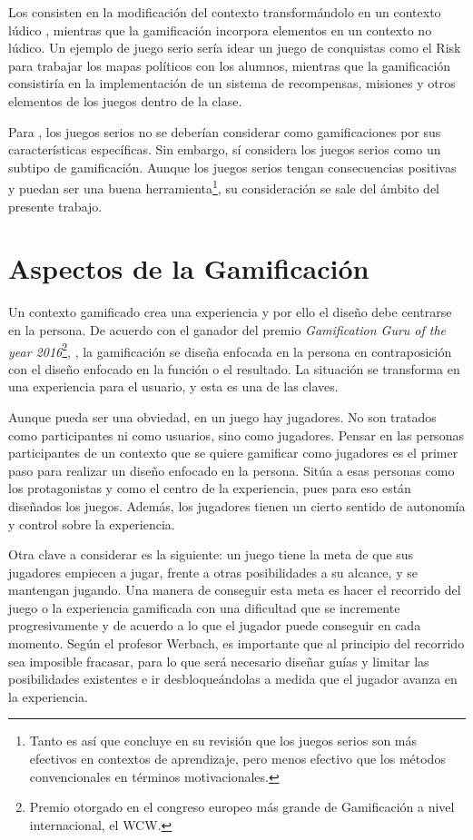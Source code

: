 Los  consisten en la modificación del contexto transformándolo en un contexto lúdico \citep{MetaSerious}, mientras que la gamificación incorpora elementos en un contexto no lúdico.
%
Un ejemplo de juego serio sería idear un juego de conquistas como el Risk para trabajar los mapas políticos con los alumnos, mientras que la gamificación consistiría en la implementación de un sistema de recompensas, misiones y otros elementos de los juegos dentro de la clase.

Para \cite{kwerb-WhatIs}, los juegos serios no se deberían considerar como gamificaciones por sus características específicas.
%
Sin embargo, \citep{GamificationDef} sí considera los juegos serios como un subtipo de gamificación.
%
Aunque los juegos serios tengan consecuencias positivas y puedan ser una buena herramienta\footnote{Tanto es así que  \cite{MetaSerious} concluye en su revisión que los juegos serios son más efectivos en contextos de aprendizaje, pero menos efectivo que los métodos convencionales en términos motivacionales.}, su consideración se sale del ámbito del presente trabajo.

\section{Aspectos de la Gamificación}

Un contexto gamificado crea una experiencia y por ello el diseño debe centrarse en la persona.
%
De acuerdo con el ganador del premio \textit{Gamification Guru of the year 2016}\footnote{Premio otorgado en el congreso europeo más grande de Gamificación a nivel internacional, el \gls{WCW}.},  \cite{BeyondPBL}, la gamificación se diseña enfocada en la persona en contraposición con el diseño enfocado en la función o el resultado.
%
La situación se transforma en una experiencia para el usuario, y esta es una de las claves.

Aunque pueda ser una obviedad, en un juego hay jugadores. 
%
No son tratados como participantes ni como usuarios, sino como jugadores.
%
Pensar en las personas participantes de un contexto que se quiere gamificar como jugadores es el primer paso para realizar un diseño enfocado en la persona.
%
Sitúa a esas personas como los protagonistas y como el centro de la experiencia, pues para eso están diseñados los juegos.
%
Además, los jugadores tienen un cierto sentido de autonomía y control sobre la experiencia.

Otra clave a considerar es la siguiente: un juego tiene la meta de que sus jugadores empiecen a jugar, frente a otras posibilidades a su alcance, y se mantengan jugando.
%
Una manera de conseguir esta meta es hacer el recorrido del juego o la experiencia gamificada con una dificultad que se incremente progresivamente y de acuerdo a lo que el jugador puede conseguir en cada momento. 
%
Según el profesor Werbach, es importante que al principio del recorrido sea imposible fracasar, para lo que será necesario diseñar guías y limitar las posibilidades existentes e ir desbloqueándolas a medida que el jugador avanza en la experiencia.


